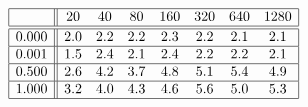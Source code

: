 \[
\begin{array}{|c||ccccccc|}
\hline 
& 20 & 40 & 80 & 160 & 320 & 640 & 1280\\
\hline \hline 
0.000 & 2.0 & 2.2 & 2.2 & 2.3 & 2.2 & 2.1 & 2.1 \\ \hline 
0.001 & 1.5 & 2.4 & 2.1 & 2.4 & 2.2 & 2.2 & 2.1 \\ \hline 
0.500 & 2.6 & 4.2 & 3.7 & 4.8 & 5.1 & 5.4 & 4.9 \\ \hline 
1.000 & 3.2 & 4.0 & 4.3 & 4.6 & 5.6 & 5.0 & 5.3 \\ \hline 
\end{array}
\]

